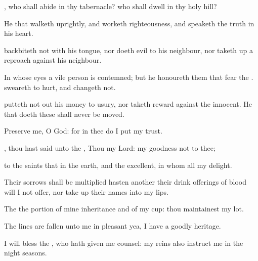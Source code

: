 {\Q {}, who shall
abide in thy
tabernacle? who shall
dwell in thy
holy
hill?


\par }{\Q {}He that
walketh
uprightly, and
worketh
righteousness, and
speaketh the
truth in his
heart.


\par }{\Q {}
backbiteth not with his
tongue, nor
doeth
evil to his
neighbour, nor taketh
up a
reproach against his
neighbour.


\par }{\Q {}In whose
eyes a vile
person is
contemned; but he
honoureth them that
fear the
{}.
{}
sweareth to
{}
hurt, and
changeth not.


\par }{\Q {} putteth not
out his
money to
usury, nor
taketh
reward against the
innocent. He that
doeth these
{} shall
never be
moved.




\par }
{\Q {}Preserve me, O
God: for in thee do I put my
trust.


\par }{\Q {}, thou hast
said unto the
{}, Thou
{} my
Lord: my
goodness
{} not to thee;


\par }{\Q {} to the
saints
that
{} in the
earth, and
{} the
excellent, in whom
{} all my
delight.


\par }{\Q {}Their
sorrows shall be
multiplied
{}
hasten
{}
another
{} their drink
offerings of
blood will I not
offer,
nor take
up their
names into my
lips.


\par }{\Q {}The
{}
{} the
portion of mine
inheritance and of my
cup: thou
maintainest my
lot.


\par }{\Q {}The
lines are
fallen unto me in
pleasant
{} yea, I have a
goodly
heritage.


\par }{\Q {}I will
bless the
{}, who hath given me
counsel: my
reins also
instruct me in the night
seasons.


\par }{\BB \par }
